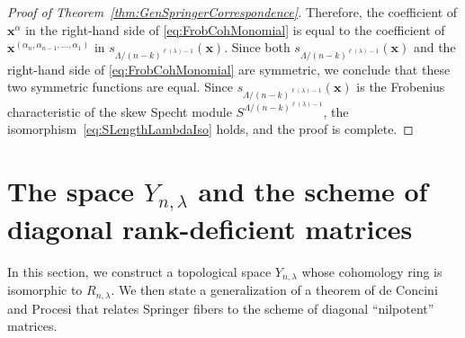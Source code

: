 \documentclass[12pt]{amsart}
\newcommand{\Frob}{\mathrm{Frob}}
\newcommand{\la}{\lambda}
\newcommand{\bx}{\mathbf{x}}
\begin{document}
\begin{proof}[Proof of Theorem~\ref{thm:GenSpringerCorrespondence}]
Therefore, the coefficient of $\bx^\alpha$ in the right-hand side of \eqref{eq:FrobCohMonomial} is equal to the coefficient of $\bx^{(\alpha_n,\alpha_{n-1},\dots, \alpha_1)}$ in $s_{\Lambda/(n-k)^{\ell(\la)-1}}(\bx)$. Since both $s_{\Lambda/(n-k)^{\ell(\la)-1}}(\bx)$ and the right-hand side of \eqref{eq:FrobCohMonomial} are symmetric, we conclude that these two symmetric functions are equal. Since $s_{\Lambda/(n-k)^{\ell(\la)-1}}(\bx)$ is the Frobenius characteristic of the skew Specht module $S^{\Lambda/(n-k)^{\ell(\la)-1}}$, the isomorphism~\eqref{eq:SLengthLambdaIso} holds, and the proof is complete.
\end{proof}





\section{The space $Y_{n,\lambda}$ and the scheme of diagonal rank-deficient matrices}\label{sec:IndVariety}

In this section, we construct a topological space $Y_{n,\lambda}$ whose cohomology ring is isomorphic to $R_{n,\lambda}$. We then state a generalization of a theorem of de Concini and Procesi that relates Springer fibers to the scheme of diagonal ``nilpotent'' matrices.
\end{document}
